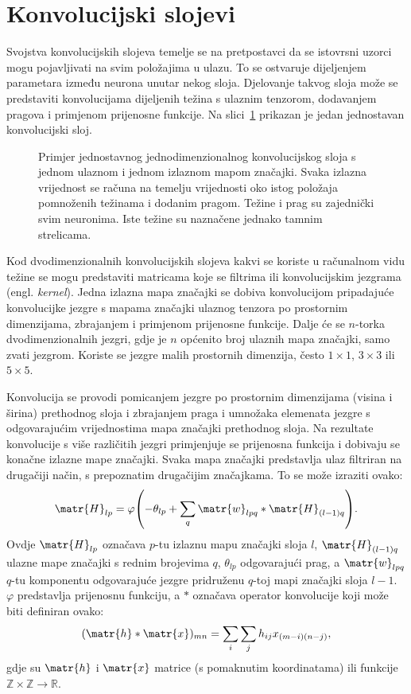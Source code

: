 \documentclass[utf8, diplomski, numeric, lmodern]{fer}
\newcommand{\ilustracija}[1]{}
\begin{document}
\section{Konvolucijski slojevi} \label{sec:konv-sloj}

Svojstva konvolucijskih slojeva temelje se na pretpostavci da se istovrsni uzorci mogu pojavljivati na svim položajima u ulazu. To se ostvaruje dijeljenjem parametara između neurona unutar nekog sloja. Djelovanje takvog sloja može se predstaviti konvolucijama dijeljenih težina s ulaznim tenzorom, dodavanjem pragova i primjenom prijenosne funkcije. Na slici~\ref{fig:lok_pov} prikazan je jedan jednostavan konvolucijski sloj.

\begin{figure}[htbp] \centering
	\ilustracija{konv-sloj}
	\caption{Primjer jednostavnog jednodimenzionalnog konvolucijskog sloja s jednom ulaznom i jednom izlaznom mapom značajki. Svaka izlazna vrijednost se računa na temelju vrijednosti oko istog položaja pomnoženih težinama i dodanim pragom. Težine i prag su zajednički svim neuronima. Iste težine su naznačene jednako tamnim strelicama.}
	\label{fig:lok_pov}
\end{figure}

Kod dvodimenzionalnih konvolucijskih slojeva kakvi se koriste u računalnom vidu težine se mogu predstaviti matricama koje se filtrima ili konvolucijskim jezgrama (engl. \emph{kernel}). Jedna izlazna mapa značajki se dobiva konvolucijom pripadajuće konvolucijke jezgre s mapama značajki ulaznog tenzora po prostornim dimenzijama, zbrajanjem i primjenom prijenosne funkcije. Dalje će se $n$-torka dvodimenzionalnih jezgri, gdje je $n$ općenito broj ulaznih mapa značajki, samo zvati jezgrom. Koriste se jezgre malih prostornih dimenzija, često $1\times 1$, $3\times3$ ili $5\times5$.

Konvolucija se provodi pomicanjem jezgre po prostornim dimenzijama (visina i širina) prethodnog sloja i zbrajanjem praga i umnožaka elemenata jezgre s odgovarajućim vrijednostima mapa značajki prethodnog sloja. Na rezultate konvolucije s više različitih jezgri primjenjuje se prijenosna funkcija i dobivaju se konačne izlazne mape značajki. Svaka mapa značajki predstavlja ulaz filtriran na drugačiji način, s prepoznatim drugačijim značajkama. To se može izraziti ovako:
\begin{equation}
\matr{H}_{lp}=\varphi\left(
-\theta_{lp} + \sum_q \matr{w}_{lpq}\ast\matr{H}_{(l-1)q}\right).
\end{equation}
Ovdje $\matr{H}_{lp}$ označava $p$-tu izlaznu mapu značajki sloja $l$, $\matr{H}_{(l-1)q}$ ulazne mape značajki s rednim brojevima $q$, $\theta_{lp}$ odgovarajući prag, a $\matr{w}_{lpq}$ $q$-tu komponentu odgovarajuće jezgre pridruženu $q$-toj mapi značajki sloja $l-1$. $\varphi$ predstavlja prijenosnu funkciju, a $\ast$ označava operator konvolucije koji može biti definiran ovako:
\begin{equation}
(\matr{h}\ast\matr{x})_{mn} = \sum_i \sum_j h_{ij} x_{(m-i)(n-j)},
\end{equation}
gdje su $\matr{h}$ i $\matr{x}$ matrice (s pomaknutim koordinatama) ili funkcije $\mathbb{Z}\times\mathbb{Z}\rightarrow\mathbb{R}$.
\end{document}
